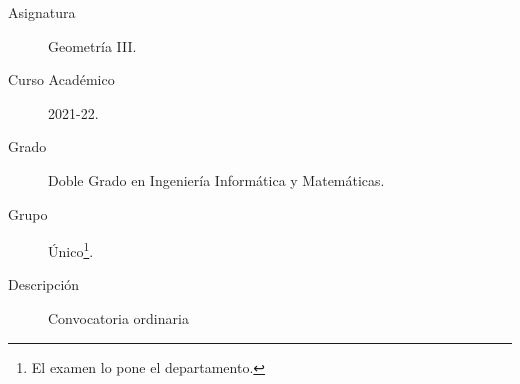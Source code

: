 \documentclass[12pt]{article}
\begin{document}

    
    

    
    \begin{description}
        \item[Asignatura] Geometría III.
        \item[Curso Académico] 2021-22.
        \item[Grado] Doble Grado en Ingeniería Informática y Matemáticas.
        \item[Grupo] Único\footnote{El examen lo pone el departamento.}.
        \item[Descripción] Convocatoria ordinaria
    
    \end{description}
    \newpage
\end{document}

